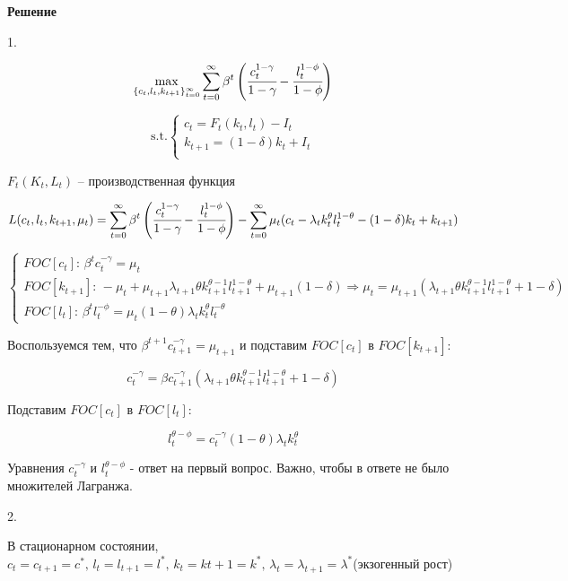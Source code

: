 \documentclass[reqno]{article}
\theoremstyle{definition}
\theoremstyle{definition}
\theoremstyle{definition}
\theoremstyle{definition}
\theoremstyle{definition}
\theoremstyle{definition}
\theoremstyle{definition}
\theoremstyle{definition}
\theoremstyle{definition}
\begin{document}
	\textbf{Решение}
	
	1. 
	
	$$\max\limits_{\{c_t,l_t,k_{t+1}\}_{t=0}^\infty} \sum_{t=0}^\infty \beta^t \left(\cfrac{c_t^{1-\gamma}}{1-\gamma} - \cfrac{l_t^{1-\phi}}{1-\phi}\right)$$
	
	$$
	\text{s.t.}
	\begin{cases}
		c_t = F_t(k_t, l_t) - I_t \\ 
		
		k_{t+1} = (1-\delta)k_t + I_t \\
	\end{cases}
	$$
	
	$F_t(K_t, L_t)$ -- производственная функция
	
	$$L(c_t,l_t,k_{t+1},\mu_t) = \sum_{t=0}^\infty \beta^t \left(\cfrac{c_t^{1-\gamma}}{1-\gamma} - \cfrac{l_t^{1-\phi}}{1-\phi}\right) - \sum_{t=0}^\infty \mu_t ( c_t - \lambda_t k_t^\theta l_t^{1-\theta} - (1-\delta)k_t + k_{t+1} )$$
	
	$
	\begin{cases}
		FOC[c_t]: \, \beta^t c_t^{-\gamma} = \mu_t \\ 
		
		FOC[k_{t+1}]: \, - \mu_t + \mu_{t+1}\lambda_{t+1} \theta k_{t+1}^{\theta-1} l_{t+1}^{1-\theta} + \mu_{t+1}(1-\delta)  \Rightarrow \mu_t = \mu_{t+1} ( \lambda_{t+1} \theta k_{t+1}^{\theta-1} l_{t+1}^{1-\theta} + 1-\delta)\\
		
		FOC[l_t]: \, \beta^t l_t^{-\phi} = \mu_t (1-\theta)\lambda_t k_t^\theta l_t^{-\theta}
	\end{cases}
	$
	
	Воспользуемся тем, что $\beta^{t+1} c_{t+1}^{-\gamma} = \mu_{t+1}$ и подставим $FOC[c_t]$ в $FOC[k_{t+1}]$:
	
	$$c_t^{-\gamma} = \beta c_{t+1}^{-\gamma} (\lambda_{t+1} \theta k_{t+1}^{\theta-1} l_{t+1}^{1-\theta} + 1-\delta)$$
	
	Подставим $FOC[c_t]$ в $FOC[l_t]$:
	
	$$l_t^{\theta - \phi} = c_{t}^{-\gamma} (1-\theta)\lambda_t k_t^\theta$$
	
	Уравнения $c_t^{-\gamma}$ и $l_t^{\theta - \phi}$ - ответ на первый вопрос. Важно, чтобы в ответе не было множителей Лагранжа.
	
	2.
	
	В стационарном состоянии,
	$c_t = c_{t+1} = c^*, \, l_t =l_{t+1} = l^*, \, k_t=k{t+1}=k^*, \, \lambda_t=\lambda_{t+1}=\lambda^*$(экзогенный рост)
	
\end{document}
